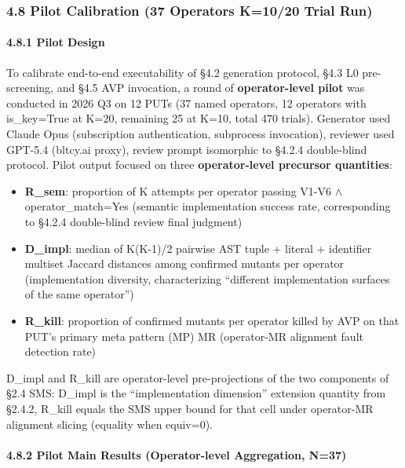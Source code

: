 \documentclass[review,12pt,authoryear]{elsarticle}
\providecommand{\tightlist}{\setlength{\itemsep}{0pt}\setlength{\parskip}{0pt}}
\begin{document}
\subsubsection{4.8 Pilot Calibration (37 Operators K=10/20 Trial
Run)}\label{pilot-calibration-37-operators-k1020-trial-run}

\paragraph{4.8.1 Pilot Design}\label{pilot-design}

To calibrate end-to-end executability of §4.2 generation protocol, §4.3
L0 pre-screening, and §4.5 AVP invocation, a round of
\textbf{operator-level pilot} was conducted in 2026 Q3 on 12 PUTs (37
named operators, 12 operators with is\_key=True at K=20, remaining 25 at
K=10, total 470 trials). Generator used Claude Opus (subscription
authentication, subprocess invocation), reviewer used GPT-5.4 (bltcy.ai
proxy), review prompt isomorphic to §4.2.4 double-blind protocol. Pilot
output focused on three \textbf{operator-level precursor quantities}:

\begin{itemize}
\tightlist
\item
  \textbf{R\_sem}: proportion of K attempts per operator passing V1-V6 $\wedge$
  operator\_match=Yes (semantic implementation success rate,
  corresponding to §4.2.4 double-blind review final judgment)
\item
  \textbf{D\_impl}: median of K(K-1)/2 pairwise AST tuple + literal +
  identifier multiset Jaccard distances among confirmed mutants per
  operator (implementation diversity, characterizing ``different
  implementation surfaces of the same operator'')
\item
  \textbf{R\_kill}: proportion of confirmed mutants per operator killed
  by AVP on that PUT's primary meta pattern (MP) MR (operator-MR
  alignment fault detection rate)
\end{itemize}

D\_impl and R\_kill are operator-level pre-projections of the two
components of §2.4 SMS: D\_impl is the ``implementation dimension''
extension quantity from §2.4.2, R\_kill equals the SMS upper bound for
that cell under operator-MR alignment slicing (equality when equiv=0).

\paragraph{4.8.2 Pilot Main Results (Operator-level Aggregation,
N=37)}\label{pilot-main-results-operator-level-aggregation-n37}
\end{document}
